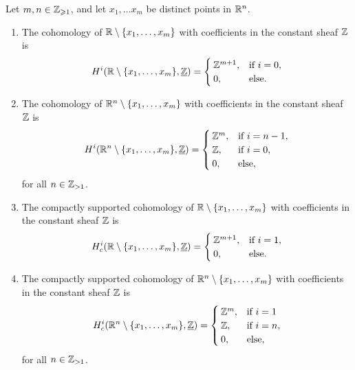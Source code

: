 \begin{prop}[name=Cohomology of Euclidean space with missing points]
Let $m,n \in \mathbb{Z}_{\geqslant 1}$, and let $x_1, \ldots x_m$ be distinct points in $\mathbb{R}^n$. 
	\begin{enumerate}
        \item The cohomology of $\mathbb{R}\setminus\{x_1, \ldots, x_m\}$
        with coefficients in the constant sheaf $\mathbb{Z}$ is \[
    	     	\cohomology^i(\bb R\setminus\{x_1, \ldots, x_m\}, \underline{\bb Z}) = \begin{cases}
                \bb Z^{m+1}, & \text{if } i = 0,\\
                0, & \text{else}.
            \end{cases}
        \]
        \item The cohomology of $\mathbb{R}^n\setminus\{x_1, \ldots, x_m\}$ with coefficients in the constant sheaf $\mathbb{Z}$ is \[
        	\cohomology^i(\bb R^n\setminus\{x_1, \ldots, x_m\}, \underline{\bb Z}) = \begin{cases}
                \bb Z^m, & \text{if } i = n-1,\\
                \bb Z, & \text{if } i = 0,\\
                0, & \text{else},
            \end{cases}
        \] for all $n \in \mathbb{Z}_{> 1}$. 
        \item The compactly supported cohomology of $\mathbb{R}\setminus\{x_1, \ldots, x_m\}$
        with coefficients in the constant sheaf $\mathbb{Z}$ is \[
    	     	\cohomology^i_c(\bb R\setminus\{x_1, \ldots, x_m\}, \underline{\bb Z}) = \begin{cases}
                \bb Z^{m+1}, & \text{if } i = 1,\\
                0, & \text{else}.
            \end{cases}
        \]
    	\item The compactly supported cohomology of $\mathbb{R}^n\setminus \{x_1, \ldots, x_m\}$ with coefficients in the constant sheaf $\mathbb{Z}$ is \[
        	\cohomology^i_c(\bb R^n\setminus \{x_1, \ldots, x_m\}, \underline{\bb Z}) = \begin{cases}
                \bb Z^{m}, & \text{if } i = 1\\
                \bb Z, & \text{if } i = n, \\
                0, &\text{else},
            \end{cases}
        \] for all $n \in \mathbb{Z}_{>1}$.
    \end{enumerate}
\end{prop}
